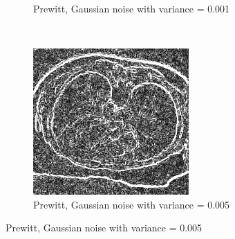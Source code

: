 \begin{figure}[H]
\begin{subfigure}{.5\textwidth}
    \caption{Prewitt, Gaussian noise with variance = 0.001}
    \label{fig:prewitt_001}
  \end{subfigure}\\%
  \begin{subfigure}{.5\textwidth}
    \centering
    \includegraphics[width=.9\textwidth]{./edgedetection/images/prewitt_005_noise}
    \caption{Prewitt, Gaussian noise with variance = 0.005}
    \label{fig:prewitt_005}
  \end{subfigure}%
  
\end{figure}

